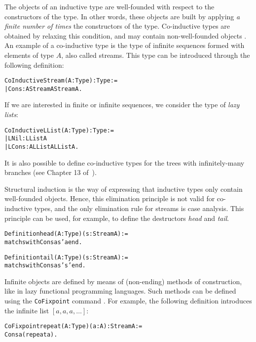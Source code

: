 \documentclass[11pt]{article}
\newcommand{\refmancite}[1]{{}}
\begin{document}
The objects of an inductive type are well-founded with respect to
the constructors of the type. In other words, these objects are built
by applying \emph{a finite number of times} the constructors of the type.
Co-inductive types are obtained by relaxing this condition,
and may contain non-well-founded objects \cite{EG96,EG95a}.  An
example of a co-inductive type is the type of  infinite
sequences formed with elements of type $A$, also called streams.  This
type can be introduced through the following definition:

\begin{alltt}
 CoInductive Stream (A: Type) :Type   :=
 | Cons : A\arrow{}Stream A\arrow{}Stream A.
\end{alltt}

If we are interested in finite or infinite sequences, we consider the type
of \emph{lazy lists}:

\begin{alltt}
CoInductive LList (A: Type) : Type :=
 |  LNil : LList A
 |  LCons : A {\arrow} LList A {\arrow} LList A.
\end{alltt}


It is also possible to define  co-inductive types for the
trees with infinitely-many branches (see Chapter 13 of~\cite{coqart}).

Structural induction is the way of expressing that inductive types
only contain well-founded objects. Hence, this elimination principle
is not valid for co-inductive types, and the only elimination rule for
streams is case analysis.  This principle can be used, for example, to
define the destructors \textsl{head} and \textsl{tail}.

\begin{alltt}
 Definition head (A:Type)(s : Stream A) :=
   match s with Cons a s' {\funarrow} a end.

 Definition tail (A : Type)(s : Stream A) :=
      match s with Cons a s' {\funarrow} s' end.
\end{alltt}

Infinite objects are defined by means of (non-ending) methods of
construction, like in lazy functional programming languages.  Such
methods can be defined using the \texttt{CoFixpoint} command
\refmancite{Section \ref{CoFixpoint}}. For example, the following
definition introduces the infinite list $[a,a,a,\ldots]$:

\begin{alltt}
 CoFixpoint repeat (A:Type)(a:A) : Stream A :=
   Cons a (repeat a).
\end{alltt}
\end{document}
